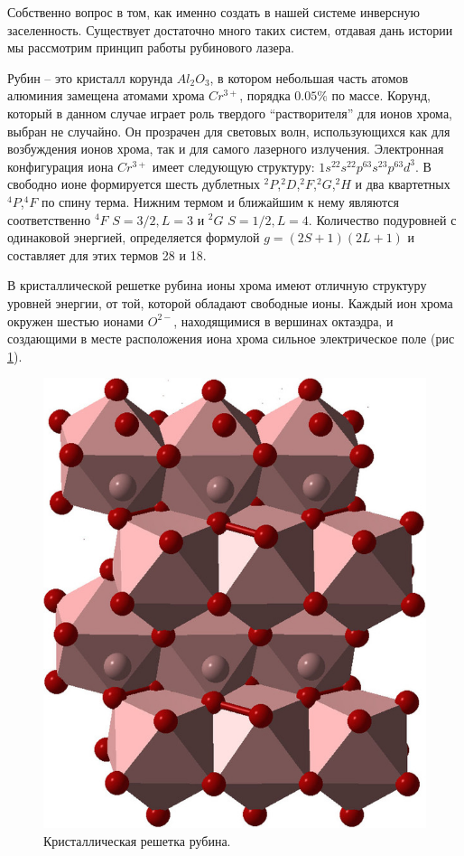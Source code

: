 \documentclass[a4paper,12pt]{article}
\theoremstyle{plain} %
\theoremstyle{definition} %
\theoremstyle{remark} %
\begin{document}
Собственно вопрос в том, как именно создать в нашей системе инверсную заселенность.
Существует достаточно много таких систем, отдавая дань истории мы рассмотрим принцип работы рубинового лазера.

Рубин -- это кристалл корунда $Al_2O_3$, в котором небольшая часть атомов алюминия замещена атомами хрома $Cr^{3+}$, порядка $0.05 \%$ по массе. Корунд, который в данном случае играет роль твердого “растворителя” для ионов хрома, выбран не случайно. Он прозрачен для световых волн, использующихся как для возбуждения ионов хрома, так и для самого лазерного излучения. Электронная конфигурация иона $Cr^{3+}$
имеет следующую структуру: $1s^22s^22p^63s^23p^63d^3$. В свободно ионе формируется 
шесть дублетных  ${}^2P$,${}^2D$,${}^2F$,${}^2G$,${}^2H$ и два квартетных ${}^4P$,${}^4F$ по спину терма. Нижним термом и ближайшим к нему являются соответственно ${}^4F$ $S=3/2, L=3$ и ${}^2G$ $S=1/2, L=4$. Количество подуровней с одинаковой энергией, определяется формулой $g=(2S+1)(2L+1)$ и составляет для этих термов 28 и 18.

В кристаллической решетке рубина ионы хрома имеют отличную структуру уровней энергии, от той, которой обладают свободные ионы. Каждый ион хрома окружен шестью ионами $O^{2-}$, находящимися в вершинах октаэдра, и создающими в месте расположения иона хрома сильное электрическое поле  (рис \ref{fig:2sistem1}). 

\begin{figure}[h!]
	\centering
	\includegraphics[scale=0.2]{pict2.png}
	\caption{Кристаллическая решетка рубина.}
	\label{fig:2sistem1}
\end{figure}
\newpage
\end{document}
